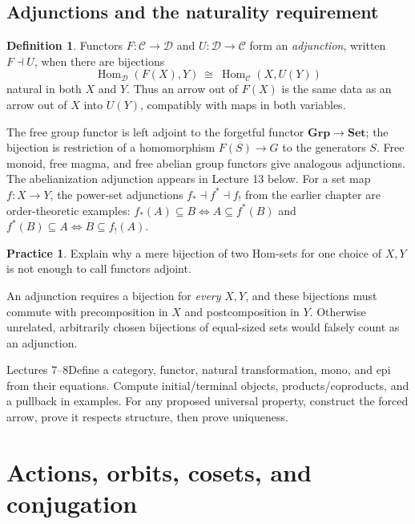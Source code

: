 \documentclass[11pt,openany]{book}
\newcommand{\Hom}{\operatorname{Hom}}\newcommand{\Aut}{\operatorname{Aut}}
\theoremstyle{definition}
\newtheorem{definition}[theorem]{Definition}
\newtheorem{exercise}[theorem]{Practice}
\begin{document}
\section{Adjunctions and the naturality requirement}
\begin{definition}Functors $F:\mathcal C\to\mathcal D$ and $U:\mathcal D\to\mathcal C$ form an \emph{adjunction}, written $F\dashv U$, when there are bijections
\[\Hom_{\mathcal D}(F(X),Y)\ \cong\ \Hom_{\mathcal C}(X,U(Y))\]
natural in both $X$ and $Y$. Thus an arrow out of $F(X)$ is the same data as an arrow out of $X$ into $U(Y)$, compatibly with maps in both variables.\end{definition}
The free group functor is left adjoint to the forgetful functor $\mathbf{Grp}\to\mathbf{Set}$; the bijection is restriction of a homomorphism $F(S)\to G$ to the generators $S$. Free monoid, free magma, and free abelian group functors give analogous adjunctions. The abelianization adjunction appears in Lecture 13 below. For a set map $f:X\to Y$, the power-set adjunctions $f_*\dashv f^*\dashv f_!$ from the earlier chapter are order-theoretic examples: $f_*(A)\subseteq B\iff A\subseteq f^*(B)$ and $f^*(B)\subseteq A\iff B\subseteq f_!(A)$.
\begin{exercise}Explain why a mere bijection of two Hom-sets for one choice of $X,Y$ is not enough to call functors adjoint.\end{exercise}
\begin{solution}An adjunction requires a bijection for \emph{every} $X,Y$, and these bijections must commute with precomposition in $X$ and postcomposition in $Y$. Otherwise unrelated, arbitrarily chosen bijections of equal-sized sets would falsely count as an adjunction.\end{solution}
\begin{checkpoint}{Lectures 7--8}Define a category, functor, natural transformation, mono, and epi from their equations. Compute initial/terminal objects, products/coproducts, and a pullback in examples. For any proposed universal property, construct the forced arrow, prove it respects structure, then prove uniqueness.\end{checkpoint}


\chapter{Actions, orbits, cosets, and conjugation}
\end{document}
